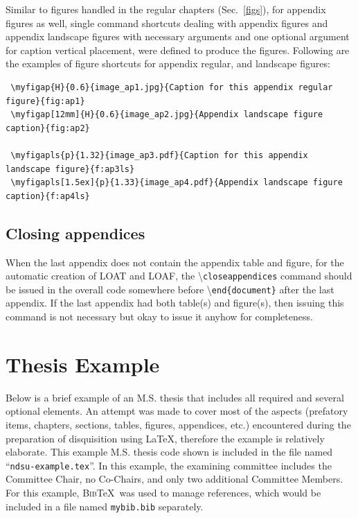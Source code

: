 \documentclass{article}
\newcommand\cmd[1]{\textbackslash\texttt{#1}}
\newcommand\ixm[2]{#2\index{#1!#2}} %
\begin{document}
Similar to figures handled in the regular chapters (Sec.~\ref{figs}), for appendix figures as well, single command shortcuts dealing with appendix figures and appendix landscape figures with necessary arguments and one optional argument for caption vertical placement, were defined to produce the figures. Following are the examples of figure shortcuts for appendix regular, and landscape figures:  

\begin{flushleft}
\hspace{-0.2cm}
\begin{minipage}{0ex}
\begin{verbatim}
 \myfigap{H}{0.6}{image_ap1.jpg}{Caption for this appendix regular figure}{fig:ap1}
 \myfigap[12mm]{H}{0.6}{image_ap2.jpg}{Appendix landscape figure caption}{fig:ap2}

 \myfigapls{p}{1.32}{image_ap3.pdf}{Caption for this appendix landscape figure}{f:ap3ls}
 \myfigapls[1.5ex]{p}{1.33}{image_ap4.pdf}{Appendix landscape figure caption}{f:ap4ls}
\end{verbatim}
\end{minipage}
\end{flushleft}

\subsection{Closing appendices}\label{apfigtab}
 When the last appendix does not contain the appendix table and figure, for the automatic creation of \ixm{appendix}{LOAT} and \ixm{appendix}{LOAF}, the \cmd{closeappendices} command should be issued in the overall code somewhere before \cmd{end\{document\}} after the last appendix. If the last appendix had both table(s) and figure(s), then issuing this command is not necessary but okay to issue it anyhow for completeness.

\section{Thesis Example}\label{example}
Below is a brief example of an M.S. thesis that includes all required and several optional elements. An attempt was made to cover most of the aspects (prefatory items, chapters, sections, tables, figures, appendices, etc.) encountered during the preparation of disquisition using \LaTeX, therefore the example is relatively elaborate. This example M.S. thesis code shown is included in the file named ``\texttt{ndsu-example.tex}''. In this example, the examining committee includes the Committee Chair, no Co-Chairs, and only two additional Committee Members. For this example, \textsc{Bib}\TeX\ was used to manage references, which would be included in a file named \texttt{mybib.bib} separately.
\end{document}
